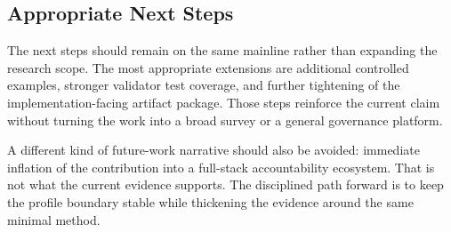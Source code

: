 \subsection{Appropriate Next Steps}

The next steps should remain on the same mainline rather than expanding the research scope. The most appropriate extensions are additional controlled examples, stronger validator test coverage, and further tightening of the implementation-facing artifact package. Those steps reinforce the current claim without turning the work into a broad survey or a general governance platform.

A different kind of future-work narrative should also be avoided: immediate inflation of the contribution into a full-stack accountability ecosystem. That is not what the current evidence supports. The disciplined path forward is to keep the profile boundary stable while thickening the evidence around the same minimal method.
